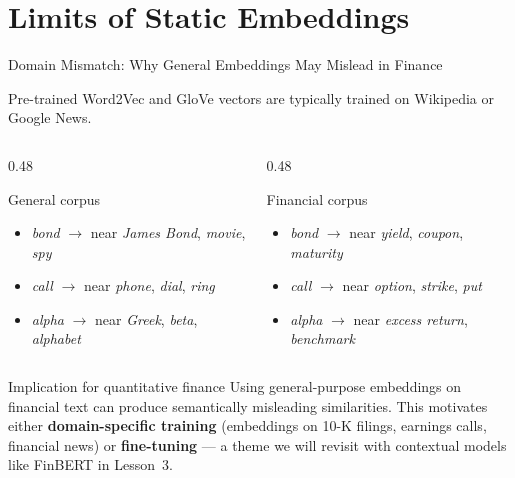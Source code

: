 \documentclass[11pt,aspectratio=169,professionalfonts]{beamer}
\begin{document}
\section{Limits of Static Embeddings}
%
\begin{frame}{Domain Mismatch: Why General Embeddings May Mislead in Finance}
 
Pre-trained Word2Vec and GloVe vectors are typically trained on
Wikipedia or Google News.
 
\medskip
 
\begin{columns}[T]
\begin{column}{0.48\textwidth}
\begin{block}{General corpus}
\begin{itemize}
  \item \textit{bond} $\to$ near \textit{James Bond},
        \textit{movie}, \textit{spy}
  \item \textit{call} $\to$ near \textit{phone},
        \textit{dial}, \textit{ring}
  \item \textit{alpha} $\to$ near \textit{Greek},
        \textit{beta}, \textit{alphabet}
\end{itemize}
\end{block}
\end{column}
\begin{column}{0.48\textwidth}
\begin{block}{Financial corpus}
\begin{itemize}
  \item \textit{bond} $\to$ near \textit{yield},
        \textit{coupon}, \textit{maturity}
  \item \textit{call} $\to$ near \textit{option},
        \textit{strike}, \textit{put}
  \item \textit{alpha} $\to$ near \textit{excess return},
        \textit{benchmark}
\end{itemize}
\end{block}
\end{column}
\end{columns}
 
\bigskip
 
\begin{alertblock}{Implication for quantitative finance}
Using general-purpose embeddings on financial text can produce
semantically misleading similarities.  This motivates either
\textbf{domain-specific training} (embeddings on 10-K filings,
earnings calls, financial news) or \textbf{fine-tuning} ---
a theme we will revisit with contextual models like FinBERT in Lesson~3.
\end{alertblock}
 
\end{frame}
\end{document}
